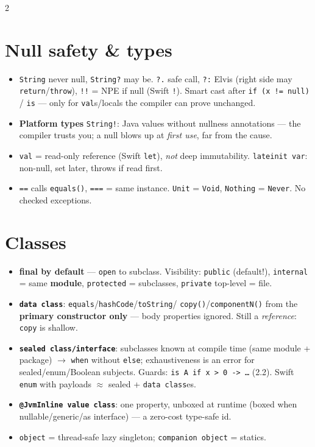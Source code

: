 \documentclass[8pt]{extarticle}
\newcommand\sq{\texttt{\hbox{?}\hbox{.}}}
\newcommand\elv{\texttt{\hbox{?}\hbox{:}}}
\newcommand\bb{\texttt{\hbox{!}\hbox{!}}}
\newcommand\ar{\texttt{\hbox{-}\hbox{>}}}
\newcommand\eqeq{\texttt{\hbox{=}\hbox{=}}}
\newcommand\eqeqeq{\texttt{\hbox{=}\hbox{=}\hbox{=}}}
\begin{document}
\begin{multicols}{2}
\raggedright

\section{Null safety \& types}
\begin{itemize}\raggedright
  \item \texttt{String} never null, \texttt{String?} may be. \sq{} safe call, \elv{} Elvis
        (right side may \texttt{return}/\texttt{throw}), \bb{} = NPE if null (Swift
        \texttt{!}). Smart cast after \texttt{if (x != null)} / \texttt{is} — only for
        \texttt{val}s/locals the compiler can prove unchanged.
  \item \textbf{Platform types} \texttt{String!}: Java values without nullness annotations —
        the compiler trusts you; a null blows up at \emph{first use}, far from the cause.
  \item \texttt{val} = read-only reference (Swift \texttt{let}), \emph{not} deep immutability.
        \texttt{lateinit var}: non-null, set later, throws if read first.
  \item \eqeq{} calls \texttt{equals()}, \eqeqeq{} = same instance. \texttt{Unit} =
        \texttt{Void}, \texttt{Nothing} = \texttt{Never}. No checked exceptions.
\end{itemize}

\section{Classes}
\begin{itemize}\raggedright
  \item \textbf{final by default} — \texttt{open} to subclass. Visibility: \texttt{public}
        (default!), \texttt{internal} = same \textbf{module}, \texttt{protected} =
        subclasses, \texttt{private} top-level = file.
  \item \textbf{\texttt{data class}}: \texttt{equals}/\texttt{hashCode}/\texttt{toString}/
        \texttt{copy()}/\texttt{componentN()} from the \textbf{primary constructor only} —
        body properties ignored. Still a \emph{reference}: \texttt{copy} is shallow.
  \item \textbf{\texttt{sealed class/interface}}: subclasses known at compile time (same
        module + package) $\to$ \texttt{when} without \texttt{else}; exhaustiveness is an
        error for sealed/enum/Boolean subjects. Guards: \texttt{is A if x > 0 \ar{} …}
        (2.2). Swift \texttt{enum} with payloads $\approx$ sealed + \texttt{data class}es.
  \item \textbf{\texttt{@JvmInline value class}}: one property, unboxed at runtime (boxed
        when nullable/generic/as interface) — a zero-cost type-safe id.
  \item \texttt{object} = thread-safe lazy singleton; \texttt{companion object} = statics.
\end{itemize}


\end{multicols}
\end{document}

